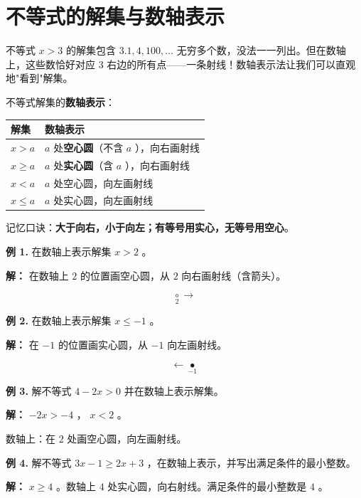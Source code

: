 \section*{不等式的解集与数轴表示}


\begin{explore}


不等式 $x > 3$ 的解集包含 $3.1, 4, 100, \ldots$ 无穷多个数，没法一一列出。但在数轴上，这些数恰好对应 $3$ 右边的所有点——一条射线！数轴表示法让我们可以直观地"看到"解集。

\end{explore}

\begin{understand}


不等式解集的\textbf{数轴表示}：

\begin{center}
\begin{tabular}{ll}
\toprule
解集 & 数轴表示 \\
\midrule
$x > a$ & $a$ 处\textbf{空心圆}（不含 $a$ ），向右画射线 \\
$x \geq a$ & $a$ 处\textbf{实心圆}（含 $a$ ），向右画射线 \\
$x < a$ & $a$ 处空心圆，向左画射线 \\
$x \leq a$ & $a$ 处实心圆，向左画射线 \\
\bottomrule
\end{tabular}
\end{center}


记忆口诀：\textbf{大于向右，小于向左；有等号用实心，无等号用空心}。

\end{understand}

\begin{workedexamples}


\textbf{例 1.} 在数轴上表示解集 $x > 2$ 。

\textbf{解：} 在数轴上 $2$ 的位置画空心圆，从 $2$ 向右画射线（含箭头）。

\[
\underset{2}{\circ} \longrightarrow
\]


\textbf{例 2.} 在数轴上表示解集 $x \leq -1$ 。

\textbf{解：} 在 $-1$ 的位置画实心圆，从 $-1$ 向左画射线。

\[
\longleftarrow \underset{-1}{\bullet}
\]


\textbf{例 3.} 解不等式 $4 - 2x > 0$ 并在数轴上表示解集。

\textbf{解：} $-2x > -4$ ， $x < 2$ 。

数轴上：在 $2$ 处画空心圆，向左画射线。

\textbf{例 4.} 解不等式 $3x - 1 \geq 2x + 3$ ，在数轴上表示，并写出满足条件的最小整数。

\textbf{解：} $x \geq 4$ 。数轴上 $4$ 处实心圆，向右射线。满足条件的最小整数是 $4$ 。

\end{workedexamples}

